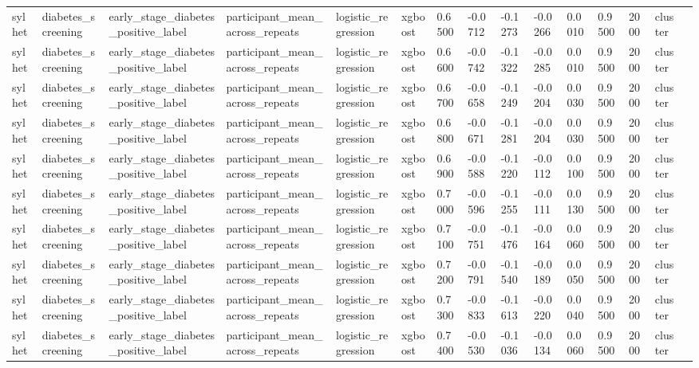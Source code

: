 \begin{tabular}{lllllllllllllll}
sylhet & diabetes\_screening & early\_stage\_diabetes\_positive\_label & participant\_mean\_across\_repeats & logistic\_regression & xgboost & 0.6500 & -0.0712 & -0.1273 & -0.0266 & 0.0010 & 0.9500 & 2000 & cluster &  \\
sylhet & diabetes\_screening & early\_stage\_diabetes\_positive\_label & participant\_mean\_across\_repeats & logistic\_regression & xgboost & 0.6600 & -0.0742 & -0.1322 & -0.0285 & 0.0010 & 0.9500 & 2000 & cluster &  \\
sylhet & diabetes\_screening & early\_stage\_diabetes\_positive\_label & participant\_mean\_across\_repeats & logistic\_regression & xgboost & 0.6700 & -0.0658 & -0.1249 & -0.0204 & 0.0030 & 0.9500 & 2000 & cluster &  \\
sylhet & diabetes\_screening & early\_stage\_diabetes\_positive\_label & participant\_mean\_across\_repeats & logistic\_regression & xgboost & 0.6800 & -0.0671 & -0.1281 & -0.0204 & 0.0030 & 0.9500 & 2000 & cluster &  \\
sylhet & diabetes\_screening & early\_stage\_diabetes\_positive\_label & participant\_mean\_across\_repeats & logistic\_regression & xgboost & 0.6900 & -0.0588 & -0.1220 & -0.0112 & 0.0100 & 0.9500 & 2000 & cluster &  \\
sylhet & diabetes\_screening & early\_stage\_diabetes\_positive\_label & participant\_mean\_across\_repeats & logistic\_regression & xgboost & 0.7000 & -0.0596 & -0.1255 & -0.0111 & 0.0130 & 0.9500 & 2000 & cluster &  \\
sylhet & diabetes\_screening & early\_stage\_diabetes\_positive\_label & participant\_mean\_across\_repeats & logistic\_regression & xgboost & 0.7100 & -0.0751 & -0.1476 & -0.0164 & 0.0060 & 0.9500 & 2000 & cluster &  \\
sylhet & diabetes\_screening & early\_stage\_diabetes\_positive\_label & participant\_mean\_across\_repeats & logistic\_regression & xgboost & 0.7200 & -0.0791 & -0.1540 & -0.0189 & 0.0050 & 0.9500 & 2000 & cluster &  \\
sylhet & diabetes\_screening & early\_stage\_diabetes\_positive\_label & participant\_mean\_across\_repeats & logistic\_regression & xgboost & 0.7300 & -0.0833 & -0.1613 & -0.0220 & 0.0040 & 0.9500 & 2000 & cluster &  \\
sylhet & diabetes\_screening & early\_stage\_diabetes\_positive\_label & participant\_mean\_across\_repeats & logistic\_regression & xgboost & 0.7400 & -0.0530 & -0.1036 & -0.0134 & 0.0060 & 0.9500 & 2000 & cluster &  \\

\end{tabular}
